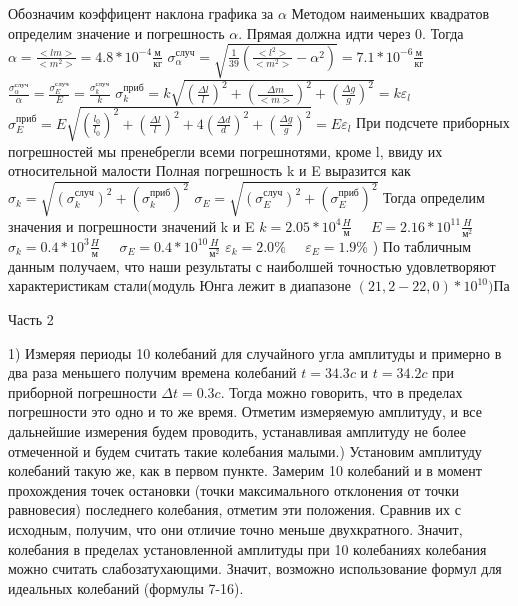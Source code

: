 \documentclass[12pt,a4paper]{article}
\begin{document}
Обозначим коэффицент наклона графика за $\alpha$ \break
Методом наименьших квадратов определим значение и погрешность $\alpha$. Прямая должна идти через 0. Тогда \hfill \break
$\alpha=\frac{<lm>}{<m^2>}=4.8*10^{-4}\frac{\text{м}}{\text{кг}}$ \hfill \break \hfill \break
$\sigma^{\text{случ}}_{\alpha}=\sqrt{\frac{1}{39}(\frac{<{l}^2>}{<m^2>}-{\alpha}^2)}=7.1*10^{-6}\frac{\text{м}}{\text{кг}}$ \;\;\;\;\; \hfill \break
$\frac{\sigma^{\text{случ}}_{\alpha}}{\alpha}=\frac{\sigma^{\text{случ}}_{E}}{E}=\frac{\sigma^{\text{случ}}_{k}}{k}$ \hfill \break
\hfill \break
$\sigma^{\text{приб}}_{k}=k\sqrt{(\frac{\Delta{l}}{l})^2+(\frac{\Delta{m}}{<m>})^2+(\frac{\Delta{g}}{g})^2}=k\varepsilon_{l}$ \hfill \break
$\sigma^{\text{приб}}_{E}=E\sqrt{(\frac{l_{0}}{l_{0}})^2+(\frac{\Delta{l}}{l})^2+4(\frac{\Delta{d}}{d})^2+(\frac{\Delta{g}}{g})^2}=E\varepsilon_{l}$ \hfill \break
При подсчете приборных погрешностей мы пренебрегли всеми погрешнотями, кроме l, ввиду их относительной малости \hfill \break 
Полная погрешность k и E выразится как \hfill \break
$\sigma_{k}=\sqrt{(\sigma^{\text{случ}}_{k})^2+(\sigma^{{\text{приб}}}_{k})^2}$ \hfill \break
$\sigma_{E}=\sqrt{(\sigma^{\text{случ}}_{E})^2+(\sigma^{{\text{приб}}}_{E})^2}$ \hfill \break
Тогда определим значения и погрешности значений k и E \hfill \break
$k=2.05*10^{4}\frac{H}{\text{м}} \;\;\;\;\; E=2.16*10^{11}\frac{H}{\text{м}^2}$ \hfill \break 
$\sigma_{k}=0.4*10^{3}\frac{H}{\text{м}} \;\;\;\;\; \sigma_{E}=0.4*10^{10}\frac{H}{\text{м}^2}$ \hfill \break 
$\varepsilon_{k}=2.0\% \;\;\;\;\; \varepsilon_{E}=1.9\%$ \hfill{}) По табличным данным получаем, что наши результаты с наиболшей точностью удовлетворяют характеристикам стали(модуль Юнга лежит в диапазоне $(21,2-22,0)*10^{10}) \text{Па}$
\newpage
\begin{center}
Часть 2
\end{center}
1) Измеряя периоды 10 колебаний для случайного угла амплитуды и примерно в два раза меньшего получим времена колебаний $t=34.3c$ и $t=34.2c$ при приборной погрешности $\Delta{t}=0.3c$. Тогда можно говорить, что в пределах погрешности это одно и то же время. Отметим измеряемую амплитуду, и все дальнейшие измерения будем проводить, устанавливая амплитуду не более отмеченной и будем считать такие колебания малыми.\hfill {}) Установим амплитуду колебаний такую же, как в первом пункте. Замерим 10 колебаний и в момент прохождения точек остановки (точки максимального отклонения от точки равновесия) последнего колебания, отметим эти положения. Сравнив их с исходным, получим, что они отличие точно меньше двухкратного. Значит, колебания в пределах установленной амплитуды при 10 колебаниях колебания можно считать слабозатухающими. Значит, возможно использование формул для идеальных колебаний (формулы 7-16).
\end{document}

